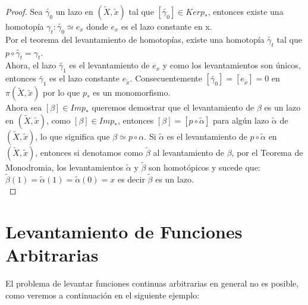 \begin{proof}

Sea $\widetilde{\gamma_0}$ un lazo en $(\widetilde{X},\widetilde{x})$ tal que $[\widetilde{\gamma_0}] \in Kerp_*$, entonces existe una homotop\'ia $\gamma_t:\widetilde{\gamma_0} \simeq e_x$ donde $e_x$ es el lazo constante en x.\\
Por el teorema del levantamiento de homotop\'ias, existe una homotop\'ia $\widetilde{\gamma_t}$ tal que $p \circ \widetilde{\gamma_t}=\gamma_t$.\\
Ahora, el lazo $\widetilde{\gamma_1}$ es el levantamiento de $e_x$ y como los levantamientos son \'unicos, entonces $\widetilde{\gamma_1}$ es el lazo constante $e_{\widetilde{x}}$. Consecuentemente $[\widetilde{\gamma_0}]=[e_{\widetilde{x}}]= 0$ en $\pi(\widetilde{X},\widetilde{x})$ por lo que $p_*$ es un monomorfismo.\\

Ahora sea $[\beta] \in Imp_*$ queremos demostrar que el levantamiento de $\beta$ es un lazo en $(\widetilde{X},\widetilde{x})$, como $[\beta] \in Imp_*$, entonces $[\beta]=[p \circ \widetilde{\alpha}]$ para alg\'un lazo $\widetilde{\alpha}$ de $(\widetilde{X},\widetilde{x})$, lo que significa que $\beta \simeq p\circ \alpha$. Si $\widetilde{\alpha}$ es el levantamiento de $p \circ \widetilde{\alpha}$ en $(\widetilde{X},\widetilde{x})$, entonces si denotamos como $\widetilde{\beta}$ al levantamiento de $\beta$, por el Teorema de Monodromia, los levantamientos $\widetilde{\alpha}$ y $\widetilde{\beta}$ son homot\'opicos y sucede que: $\widetilde{\beta}(1)=\widetilde{\alpha}(1)=\widetilde{\alpha}(0)=x$ es decir $\widetilde{\beta}$ es un lazo.\\ 

\end{proof}

\section{Levantamiento de Funciones Arbitrarias}

El problema de levantar funciones continuas arbitrarias en general no es posible, como veremos a continuaci\'on en el siguiente ejemplo:\\

